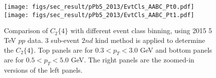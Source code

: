 \begin{figure}[H]
\centering
\texttt{[image: figs/sec\_result/pPb5\_2013/EvtCls\_AABC\_Pt0.pdf]}
\texttt{[image: figs/sec\_result/pPb5\_2013/EvtCls\_AABC\_Pt1.pdf]}
\caption{Comparison of $C_{2}\{4\}$ with different event class binning, using 2015 5 TeV $pp$ data. 3 sub-event $2nd$ kind method is applied to determine the $C_{2}\{4\}$. Top panels are for $0.3<p_{T}<3.0$ GeV and bottom panels are for $0.5<p_{T}<5.0$ GeV. The right panels are the zoomed-in versions of the left panels.}
\label{fig:result_pPb5_2013_EvtCls_AABC}
\end{figure}


